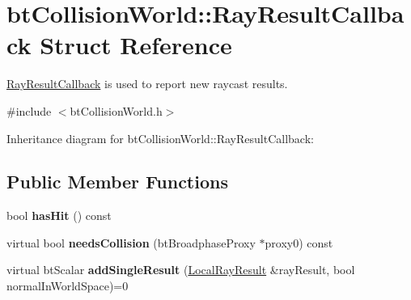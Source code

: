 \hypertarget{structbt_collision_world_1_1_ray_result_callback}{\section{bt\+Collision\+World\+:\+:Ray\+Result\+Callback Struct Reference}
\label{structbt_collision_world_1_1_ray_result_callback}
}


\hyperlink{structbt_collision_world_1_1_ray_result_callback}{Ray\+Result\+Callback} is used to report new raycast results.  




{\ttfamily \#include $<$bt\+Collision\+World.\+h$>$}



Inheritance diagram for bt\+Collision\+World\+:\+:Ray\+Result\+Callback\+:
\subsection*{Public Member Functions}
\begin{DoxyCompactItemize}
\item 
\hypertarget{structbt_collision_world_1_1_ray_result_callback_aae67fea02049a28c09ed6c3807611b57}{bool {\bfseries has\+Hit} () const }\label{structbt_collision_world_1_1_ray_result_callback_aae67fea02049a28c09ed6c3807611b57}

\item 
\hypertarget{structbt_collision_world_1_1_ray_result_callback_aea78f7b5604f90d320d7fb8c1e067135}{virtual bool {\bfseries needs\+Collision} (bt\+Broadphase\+Proxy $\ast$proxy0) const }\label{structbt_collision_world_1_1_ray_result_callback_aea78f7b5604f90d320d7fb8c1e067135}

\item 
\hypertarget{structbt_collision_world_1_1_ray_result_callback_a86c0f8b2333cc3460b37aa679f5c3b44}{virtual bt\+Scalar {\bfseries add\+Single\+Result} (\hyperlink{structbt_collision_world_1_1_local_ray_result}{Local\+Ray\+Result} \&ray\+Result, bool normal\+In\+World\+Space)=0}\label{structbt_collision_world_1_1_ray_result_callback_a86c0f8b2333cc3460b37aa679f5c3b44}

\end{DoxyCompactItemize}
